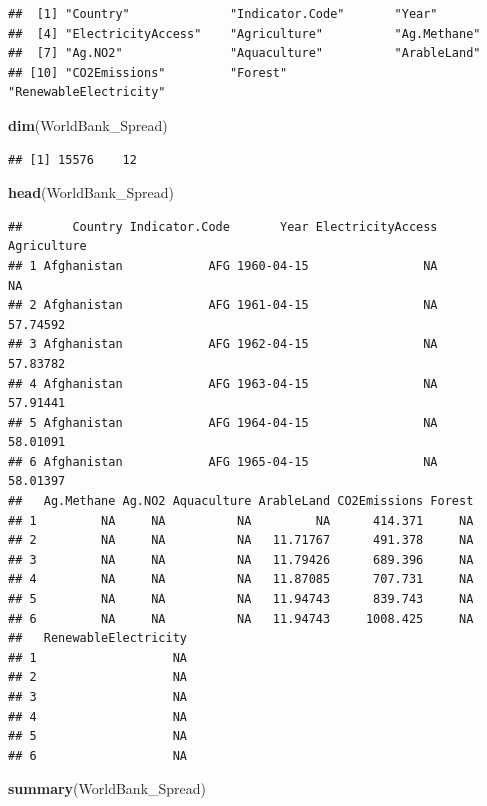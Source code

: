 \documentclass[12pt,]{article}
\newenvironment{Shaded}{\begin{snugshade}}{\end{snugshade}}
\newcommand{\KeywordTok}[1]{\textcolor[rgb]{0.13,0.29,0.53}{\textbf{#1}}}
\newcommand{\NormalTok}[1]{#1}
\begin{document}
\begin{verbatim}
##  [1] "Country"              "Indicator.Code"       "Year"                
##  [4] "ElectricityAccess"    "Agriculture"          "Ag.Methane"          
##  [7] "Ag.NO2"               "Aquaculture"          "ArableLand"          
## [10] "CO2Emissions"         "Forest"               "RenewableElectricity"
\end{verbatim}

\begin{Shaded}
\begin{Highlighting}[]
\KeywordTok{dim}\NormalTok{(WorldBank_Spread)}
\end{Highlighting}
\end{Shaded}

\begin{verbatim}
## [1] 15576    12
\end{verbatim}

\begin{Shaded}
\begin{Highlighting}[]
\KeywordTok{head}\NormalTok{(WorldBank_Spread)}
\end{Highlighting}
\end{Shaded}

\begin{verbatim}
##       Country Indicator.Code       Year ElectricityAccess Agriculture
## 1 Afghanistan            AFG 1960-04-15                NA          NA
## 2 Afghanistan            AFG 1961-04-15                NA    57.74592
## 3 Afghanistan            AFG 1962-04-15                NA    57.83782
## 4 Afghanistan            AFG 1963-04-15                NA    57.91441
## 5 Afghanistan            AFG 1964-04-15                NA    58.01091
## 6 Afghanistan            AFG 1965-04-15                NA    58.01397
##   Ag.Methane Ag.NO2 Aquaculture ArableLand CO2Emissions Forest
## 1         NA     NA          NA         NA      414.371     NA
## 2         NA     NA          NA   11.71767      491.378     NA
## 3         NA     NA          NA   11.79426      689.396     NA
## 4         NA     NA          NA   11.87085      707.731     NA
## 5         NA     NA          NA   11.94743      839.743     NA
## 6         NA     NA          NA   11.94743     1008.425     NA
##   RenewableElectricity
## 1                   NA
## 2                   NA
## 3                   NA
## 4                   NA
## 5                   NA
## 6                   NA
\end{verbatim}

\begin{Shaded}
\begin{Highlighting}[]
\KeywordTok{summary}\NormalTok{(WorldBank_Spread)}
\end{Highlighting}
\end{Shaded}
\end{document}
